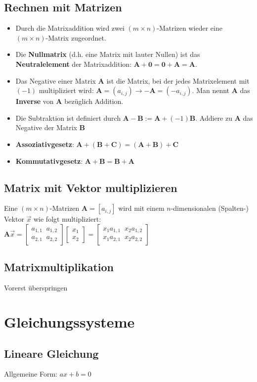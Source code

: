 \documentclass[../main.tex]{subfiles}
\begin{document}
\subsection{Rechnen mit Matrizen}
\begin{itemize}
    \item Durch die Matrixaddition wird zwei $(m\times n)$-Matrizen wieder eine $(m\times n)$-Matrix zugeordnet.
    \item Die \textbf{Nullmatrix} (d.h. eine Matrix mit lauter Nullen) ist das \textbf{Neutralelement} der Matrixaddition: $\mathbf{A+0}=\mathbf{0+A}=\mathbf{A}$.
    \item Das Negative einer Matrix \textbf{A} ist die Matrix, bei der jedes Matrixelement mit $(-1)$ multipliziert wird: $\mathbf{A}=(a_{i,j})\to -\mathbf{A}=(-a_{i,j})$. Man nennt $\mathbf{A}$ das \textbf{Inverse} von $\mathbf{A}$ bezüglich Addition.
    \item Die Subtraktion ist definiert durch $\mathbf{A-B}:=\mathbf{A}+(-1)\mathbf{B}$. Addiere zu $\mathbf{A}$ das Negative der Matrix $\mathbf{B}$
    \item \textbf{Assoziativgesetz}: $\mathbf{A}+(\mathbf{B}+\mathbf{C})=(\mathbf{A}+\mathbf{B})+\mathbf{C}$
    \item \textbf{Kommutativgesetz}: $\mathbf{A}+\mathbf{B} = \mathbf{B}+\mathbf{A}$
\end{itemize}

\subsection{Matrix mit Vektor multiplizieren}
Eine $(m\times n)$-Matrizen $\mathbf{A}=[a_{i,j}]$ wird mit einem $n$-dimensionalen (Spalten-) Vektor $\vec{x}$ wie folgt multipliziert: \\ [7pt]

$\mathbf{A} \vec{x}=
\begin{bmatrix}
    a_{1,1} \;\; a_{1,2}\\
    a_{2,1} \;\; a_{2,2} 
\end{bmatrix}
\begin{bmatrix}
    x_{1} \\
    x_{2}
\end{bmatrix} =
\begin{bmatrix}
    x_{1} a_{1,1} \;\; x_{2} a_{1,2}\\
    x_{1} a_{2,1} \;\; x_{2} a_{2,2} 
\end{bmatrix}$

\subsection{Matrixmultiplikation}
Vorerst überspringen


\section{Gleichungssysteme}
\subsection{Lineare Gleichung}
Allgemeine Form: $ax+b=0$
\end{document}
